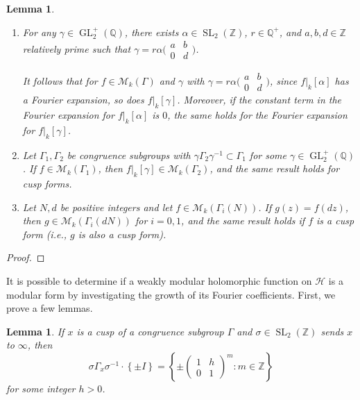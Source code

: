 \documentclass[10pt,leqno,twoside]{article}
\theoremstyle{plain}
\newtheorem{lemma}[lem]{Lemma}
\theoremstyle{definition}
\numberwithin{equation}{section}
\numberwithin{lem}{section}
\newcommand{\cbr}[1]{\left\{#1\right\}}
\newcommand{\textib}[1]{\textbf{\textit{#1\index{#1}}}} %
\DeclareMathOperator{\GL}{GL}
\DeclareMathOperator{\SL}{SL}
\newcommand{\slz}{\SL_2(\mathbb{Z})}
\newcommand{\glqp}{\GL_2^+(\mathbb{Q})}
\newcommand{\tbd}{{\Huge\color{red}{\textib{TO DO}}}}
\begin{document}
\begin{lemma}\label{lem: weight k operator properties}
    \begin{enumerate}[label = \textup{(\alph*)}]
        \item For any $\gamma\in\glqp$, there exists $\alpha\in\slz$, $r\in\mathbb Q^+$, and $a,b,d\in\mathbb Z$ relatively prime such that $\gamma = r\alpha \big(\!\begin{smallmatrix}
            a & b \\ 0 & d
        \end{smallmatrix}\!\big)$. 
    
        It follows that for $f\in\mathcal M_k(\varGamma)$ and $\gamma$ with $\gamma = r\alpha \big(\!\begin{smallmatrix}
            a & b \\ 0 & d
        \end{smallmatrix}\!\big)$, since $f|_k[\alpha]$ has a Fourier expansion, so does $f|_k[\gamma]$. Moreover, if the constant term in the Fourier expansion for $f|_k[\alpha]$ is $0$, the same holds for the Fourier expansion for $f|_k[\gamma]$.
        \item Let $\varGamma_1,\varGamma_2$ be congruence subgroups with $\gamma\varGamma_2\gamma^{-1}\subset \varGamma_1$ for some $\gamma\in\glqp$. If $f\in\mathcal M_k(\varGamma_1)$, then $f|_k[\gamma]\in\mathcal M_k(\varGamma_2)$, and the same result holds for cusp forms.
        \item Let $N,d$ be positive integers and let $f\in\mathcal M_k(\varGamma_i(N))$. If $g(z) = f(dz)$, then $g\in\mathcal M_k(\varGamma_i(dN))$ for $i = 0,1$, and the same result holds if $f$ is a cusp form \textup{(}i.e., $g$ is also a cusp form\textup{)}.
    \end{enumerate}  
\end{lemma}
\begin{proof}
    \tbd
\end{proof}
It is possible to determine if a weakly modular holomorphic function on $\mathcal H$ is a modular form by investigating the growth of its Fourier coefficients. First, we prove a few lemmas.
\begin{lemma}
    If $x$ is a cusp of a congruence subgroup $\varGamma$ and $\sigma\in\slz$ sends $x$ to $\infty$, then 
    \[\sigma\varGamma_x\sigma^{-1}\cdot\cbr{\pm I} = \cbr{\pm\begin{pmatrix}
        1 & h \\ 0 & 1
    \end{pmatrix}^m : m\in\mathbb Z}\] for some integer $h>0$.
\end{lemma}
\end{document}
